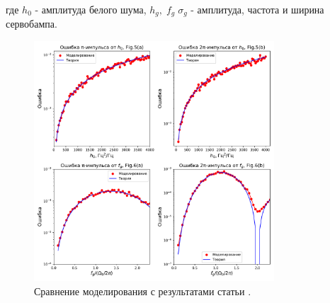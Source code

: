 где $h_0$ - амплитуда белого шума, $h_g, \;f_g \; \sigma_g$ - амплитуда, частота и ширина сервобампа. 






\begin{figure}[H]
	\centering
	\includegraphics[width=0.8\textwidth]{images/noise_errors.pdf}
	\caption{Сравнение моделирования с результатами статьи \cite{Saffman_Noise}.}
	\label{fig:noise_errors}
\end{figure}

